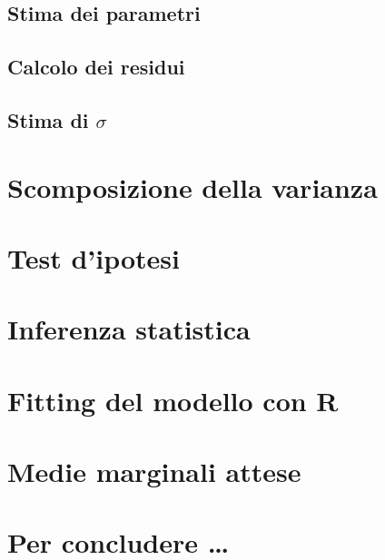 \documentclass[a4paper,12pt,oneside]{book}
\begin{document}
\hypertarget{stima-dei-parametri}{%
\subsection{Stima dei parametri}\label{stima-dei-parametri}}

\hypertarget{calcolo-dei-residui}{%
\subsection{Calcolo dei residui}\label{calcolo-dei-residui}}

\hypertarget{stima-di-sigma}{%
\subsection{\texorpdfstring{Stima di \(\sigma\)}{Stima di \textbackslash sigma}}\label{stima-di-sigma}}

\hypertarget{scomposizione-della-varianza}{%
\section{Scomposizione della varianza}\label{scomposizione-della-varianza}}

\hypertarget{test-dipotesi}{%
\section{Test d'ipotesi}\label{test-dipotesi}}

\hypertarget{inferenza-statistica}{%
\section{Inferenza statistica}\label{inferenza-statistica}}

\hypertarget{fitting-del-modello-con-r}{%
\section{Fitting del modello con R}\label{fitting-del-modello-con-r}}

\hypertarget{medie-marginali-attese}{%
\section{Medie marginali attese}\label{medie-marginali-attese}}

\hypertarget{per-concludere}{%
\section{Per concludere \ldots{}}\label{per-concludere}}
\end{document}

